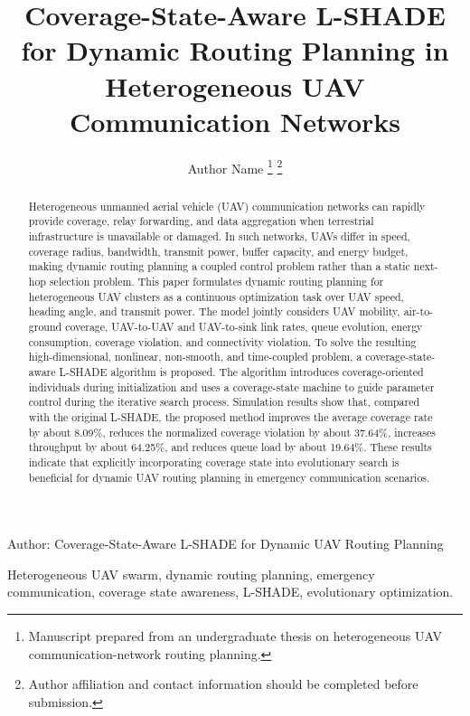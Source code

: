 \documentclass[lettersize,journal]{IEEEtran}
\begin{document}
\title{Coverage-State-Aware L-SHADE for Dynamic Routing Planning in Heterogeneous UAV Communication Networks}

\author{Author Name%
\thanks{Manuscript prepared from an undergraduate thesis on heterogeneous UAV communication-network routing planning.}
\thanks{Author affiliation and contact information should be completed before submission.}}

%
{Author: Coverage-State-Aware L-SHADE for Dynamic UAV Routing Planning}

\maketitle

\begin{abstract}
Heterogeneous unmanned aerial vehicle (UAV) communication networks can rapidly provide coverage, relay forwarding, and data aggregation when terrestrial infrastructure is unavailable or damaged. In such networks, UAVs differ in speed, coverage radius, bandwidth, transmit power, buffer capacity, and energy budget, making dynamic routing planning a coupled control problem rather than a static next-hop selection problem. This paper formulates dynamic routing planning for heterogeneous UAV clusters as a continuous optimization task over UAV speed, heading angle, and transmit power. The model jointly considers UAV mobility, air-to-ground coverage, UAV-to-UAV and UAV-to-sink link rates, queue evolution, energy consumption, coverage violation, and connectivity violation. To solve the resulting high-dimensional, nonlinear, non-smooth, and time-coupled problem, a coverage-state-aware L-SHADE algorithm is proposed. The algorithm introduces coverage-oriented individuals during initialization and uses a coverage-state machine to guide parameter control during the iterative search process. Simulation results show that, compared with the original L-SHADE, the proposed method improves the average coverage rate by about 8.09\%, reduces the normalized coverage violation by about 37.64\%, increases throughput by about 64.25\%, and reduces queue load by about 19.64\%. These results indicate that explicitly incorporating coverage state into evolutionary search is beneficial for dynamic UAV routing planning in emergency communication scenarios.
\end{abstract}

\begin{IEEEkeywords}
Heterogeneous UAV swarm, dynamic routing planning, emergency communication, coverage state awareness, L-SHADE, evolutionary optimization.
\end{IEEEkeywords}
\end{document}
